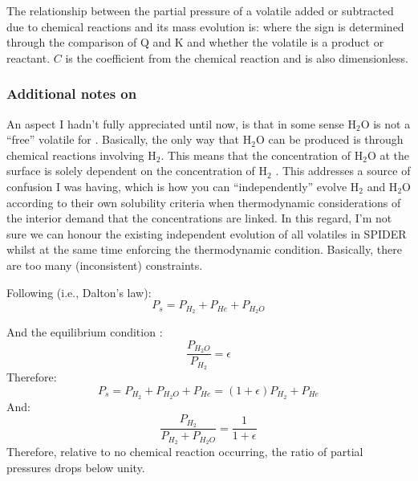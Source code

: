 The relationship between the partial pressure of a volatile added or subtracted due to chemical reactions and its mass evolution is: 
where the sign is determined through the comparison of Q and K and whether the volatile is a product or reactant. $C$ is the coefficient from the chemical reaction and is also dimensionless.  

\subsubsection{Additional notes on \cite{OS19}}
An aspect I hadn't fully appreciated until now, is that in some sense H$_2$O is not a ``free'' volatile for \cite{OS19}.  Basically, the only way that H$_2$O can be produced is through chemical reactions involving H$_2$.  This means that the concentration of H$_2$O at the surface is solely dependent on the concentration of H$_2$ \citep[Eq.~39,][]{OS19}.  This addresses a source of confusion I was having, which is how you can ``independently'' evolve H$_2$ and H$_2$O according to their own solubility criteria when thermodynamic considerations of the interior demand that the concentrations are linked.  In this regard, I'm not sure we can honour the existing independent evolution of all volatiles in SPIDER whilst at the same time enforcing the thermodynamic condition.  Basically, there are too many (inconsistent) constraints.

Following \cite[Eq.~35,][]{OS19} (i.e., Dalton's law):
\begin{equation}
P_s = P_{H_2} + P_{He} + P_{H_2O}
\end{equation}

And the equilibrium condition \citep[Eq.~36,][]{OS19}:
\begin{equation}
\frac{P_{H_2O}}{P_{H_2}} = \epsilon
\end{equation}
Therefore:
\begin{equation}
P_s = P_{H_2} + P_{H_2O} + P_{He} = (1+\epsilon) P_{H_2} + P_{He} %
\end{equation}
And:
\begin{equation}
\frac{P_{H_2}}{P_{H_2} + P_{H_2O}} = \frac{1}{1+\epsilon}
\end{equation}
Therefore, relative to no chemical reaction occurring, the ratio of partial pressures drops below unity.

